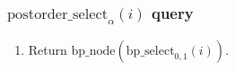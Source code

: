 \documentclass[12pt]{article}
\newcommand{\postorderselectb}{\mathrm{postorder\_select}}
\newcommand{\bpselectb}{\mathrm{bp\_select}}
\newcommand{\bpnodeb}{\mathrm{bp\_node}}
\newcommand{\postorderselect}[2]{\postorderselectb_{#1}(#2)}
\newcommand{\idxzero}{0}
\newcommand{\idxtotal}{1}
\newcommand{\bpselect}[2]{\bpselectb_{#1}(#2)}
\newcommand{\bpnode}[1]{\bpnodeb(#1)}
\begin{document}
\subsubsection{$\postorderselect{\alpha}{i}$ query}
\begin{enumerate}
\item
Return $\bpnode{\bpselect{\idxzero,\idxtotal}{i}}$.
\end{enumerate}





\end{document}
